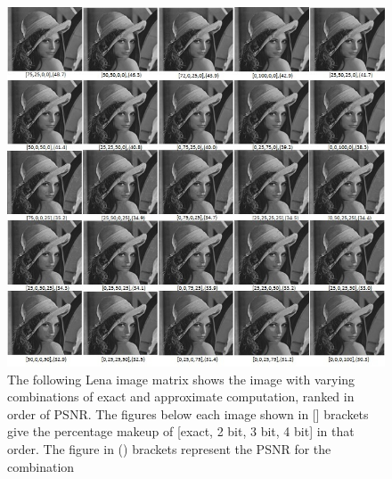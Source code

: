 \documentclass[journal]{IEEEtran}
\begin{document}
\newpage
{}
\begin{figure}[htbp]
  \centering
  \includegraphics[width=\textwidth]{LenaMatrix2.jpg}
  \caption{The following Lena image matrix shows the image with varying combinations of exact and approximate computation, ranked in order of PSNR. The figures below each image shown in [] brackets give the percentage makeup of [exact, 2 bit, 3 bit, 4 bit] in that order. The figure in () brackets represent the PSNR for the combination}
\label{fig:LenaMat2}
\end{figure}
\end{document}
